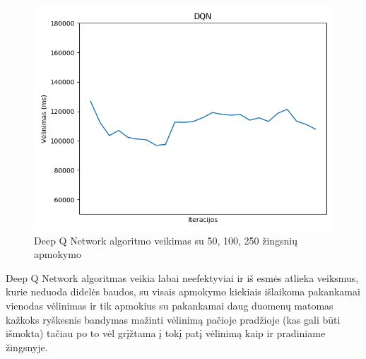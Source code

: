 \documentclass{VUMIFPSbakalaurinis}
\begin{document}
\begin{figure}[H]
\begin{minipage}[b]{0.4\textwidth}
        \includegraphics[width=\textwidth]{img/dqn_250_2.png}
    \end{minipage}
    \caption{Deep Q Network algoritmo veikimas su 50, 100, 250 žingsnių apmokymo}
\end{figure}
Deep Q Network algoritmas veikia labai neefektyviai ir iš esmės atlieka veiksmus, kurie neduoda didelės baudos, su visais apmokymo kiekiais išlaikoma pakankamai vienodas vėlinimas ir tik apmokius su pakankamai daug duomenų matomas kažkoks ryškesnis bandymas mažinti vėlinimą pačioje pradžioje (kas gali būti išmokta) tačiau po to vėl grįžtama į tokį patį vėlinimą kaip ir pradiniame žingsnyje.
\end{document}

